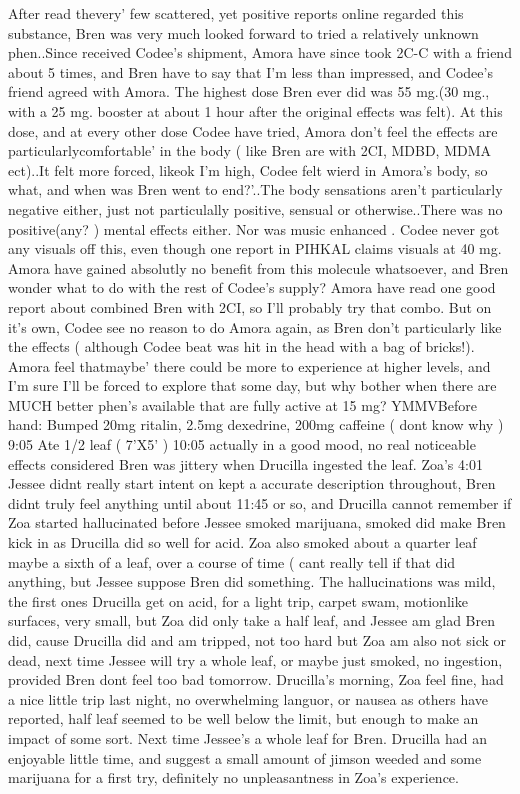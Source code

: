 \documentclass[12pt]{book}
\begin{document}
After read thevery' few scattered, yet positive reports online regarded this substance, Bren was very much looked forward to tried a relatively unknown phen..Since received Codee's shipment, Amora have since took 2C-C with a friend about 5 times, and Bren have to say that I'm less than impressed, and Codee's friend agreed with Amora. The highest dose Bren ever did was 55 mg.(30 mg., with a 25 mg. booster at about 1 hour after the original effects was felt). At this dose, and at every other dose Codee have tried, Amora don't feel the effects are particularlycomfortable' in the body ( like Bren are with 2CI, MDBD, MDMA ect)..It felt more forced, likeok I'm high, Codee felt wierd in Amora's body, so what, and when was Bren went to end?'..The body sensations aren't particularly negative either, just not particulally positive, sensual or otherwise..There was no positive(any? ) mental effects either. Nor was music enhanced . Codee never got any visuals off this, even though one report in PIHKAL claims visuals at 40 mg. Amora have gained absolutly no benefit from this molecule whatsoever, and Bren wonder what to do with the rest of Codee's supply? Amora have read one good report about combined Bren with 2CI, so I'll probably try that combo. But on it's own, Codee see no reason to do Amora again, as Bren don't particularly like the effects ( although Codee beat was hit in the head with a bag of bricks!). Amora feel thatmaybe' there could be more to experience at higher levels, and I'm sure I'll be forced to explore that some day, but why bother when there are MUCH better phen's available that are fully active at 15 mg? YMMVBefore hand: Bumped 20mg ritalin, 2.5mg dexedrine, 200mg caffeine ( dont know why ) 9:05 Ate 1/2 leaf ( 7'X5' ) 10:05 actually in a good mood, no real noticeable effects considered Bren was jittery when Drucilla ingested the leaf. Zoa's 4:01 Jessee didnt really start intent on kept a accurate description throughout, Bren didnt truly feel anything until about 11:45 or so, and Drucilla cannot remember if Zoa started hallucinated before Jessee smoked marijuana, smoked did make Bren kick in as Drucilla did so well for acid. Zoa also smoked about a quarter leaf maybe a sixth of a leaf, over a course of time ( cant really tell if that did anything, but Jessee suppose Bren did something. The hallucinations was mild, the first ones Drucilla get on acid, for a light trip, carpet swam, motionlike surfaces, very small, but Zoa did only take a half leaf, and Jessee am glad Bren did, cause Drucilla did and am tripped, not too hard but Zoa am also not sick or dead, next time Jessee will try a whole leaf, or maybe just smoked, no ingestion, provided Bren dont feel too bad tomorrow. Drucilla's morning, Zoa feel fine, had a nice little trip last night, no overwhelming languor, or nausea as others have reported, half leaf seemed to be well below the limit, but enough to make an impact of some sort. Next time Jessee's a whole leaf for Bren. Drucilla had an enjoyable little time, and suggest a small amount of jimson weeded and some marijuana for a first try, definitely no unpleasantness in Zoa's experience.
\end{document}
